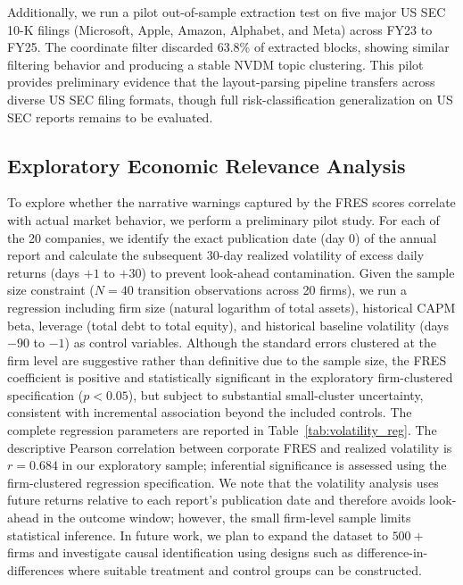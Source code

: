 \documentclass[journal]{IEEEtran}
\begin{document}
Additionally, we run a pilot out-of-sample extraction test on five major US SEC 10-K filings (Microsoft, Apple, Amazon, Alphabet, and Meta) across FY23 to FY25. The coordinate filter discarded 63.8\% of extracted blocks, showing similar filtering behavior and producing a stable NVDM topic clustering. This pilot provides preliminary evidence that the layout-parsing pipeline transfers across diverse US SEC filing formats, though full risk-classification generalization on US SEC reports remains to be evaluated.

\subsection{Exploratory Economic Relevance Analysis}
To explore whether the narrative warnings captured by the FRES scores correlate with actual market behavior, we perform a preliminary pilot study. For each of the 20 companies, we identify the exact publication date (day 0) of the annual report and calculate the subsequent 30-day realized volatility of excess daily returns (days $+1$ to $+30$) to prevent look-ahead contamination. Given the sample size constraint ($N=40$ transition observations across 20 firms), we run a regression including firm size (natural logarithm of total assets), historical CAPM beta, leverage (total debt to total equity), and historical baseline volatility (days $-90$ to $-1$) as control variables. Although the standard errors clustered at the firm level are suggestive rather than definitive due to the sample size, the FRES coefficient is positive and statistically significant in the exploratory firm-clustered specification ($p < 0.05$), but subject to substantial small-cluster uncertainty, consistent with incremental association beyond the included controls. The complete regression parameters are reported in Table~\ref{tab:volatility_reg}. The descriptive Pearson correlation between corporate FRES and realized volatility is $r = 0.684$ in our exploratory sample; inferential significance is assessed using the firm-clustered regression specification. We note that the volatility analysis uses future returns relative to each report's publication date and therefore avoids look-ahead in the outcome window; however, the small firm-level sample limits statistical inference. In future work, we plan to expand the dataset to $500+$ firms and investigate causal identification using designs such as difference-in-differences where suitable treatment and control groups can be constructed.
\end{document}

